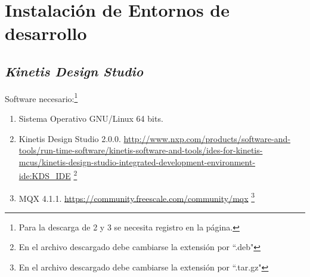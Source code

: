 
\chapter{Instalación de Entornos de desarrollo} %

\label{AppendixB} %


\section{\textit{Kinetis Design Studio}} %

Software necesario:\footnote{Para la descarga de 2 y 3 se necesita registro en la página.}

\begin{enumerate}
\item Sistema Operativo GNU/Linux 64 bits.
\item Kinetis Design Studio 2.0.0. \href{url}{http://www.nxp.com/products/software-and-tools/run-time-software/kinetis-software-and-tools/ides-for-kinetis-mcus/kinetis-design-studio-integrated-development-environment-ide:KDS\_IDE}
\footnote{En el archivo descargado debe cambiarse la extensión por ``.deb" }
\item MQX 4.1.1. \href{url}{https://community.freescale.com/community/mqx}
\footnote{En el archivo descargado debe cambiarse la extensión por ``.tar.gz"}
\end{enumerate}

